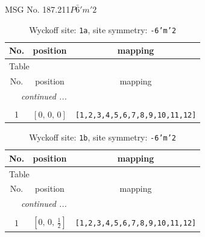 \documentclass[fleqn,8pt]{jsarticle}
\begin{document}
\setcounter{MaxMatrixCols}{32}

\renewcommand{\tablename}{Table~}
\renewcommand{\figurename}{Figure~}
\begin{center}
\LARGE
MSG No. 187.211\quad$P\bar{6}'m'2$
\end{center}
\renewcommand{\arraystretch}{1.2}
\begin{longtable}{ccc}
\caption{Wyckoff site: {\tt 1a}, site symmetry: {\tt -6'm'2}}
 \\
 \hline \hline
No. & position & mapping \\ \hline \endfirsthead

\multicolumn{2}{l}{\tablename\ \thetable{}} \\
 \hline \hline
No. & position & mapping \\ \hline \endhead

 \hline \hline
\multicolumn{2}{r}{\footnotesize\it continued ...} \\ \endfoot

 \hline \hline
\multicolumn{2}{r}{} \\ \endlastfoot

1 & $\left[ 0,\, 0,\, 0 \right]$ & {\tt [1,2,3,4,5,6,7,8,9,10,11,12]} \\
\end{longtable}
\renewcommand{\arraystretch}{1.2}
\begin{longtable}{ccc}
\caption{Wyckoff site: {\tt 1b}, site symmetry: {\tt -6'm'2}}
 \\
 \hline \hline
No. & position & mapping \\ \hline \endfirsthead

\multicolumn{2}{l}{\tablename\ \thetable{}} \\
 \hline \hline
No. & position & mapping \\ \hline \endhead

 \hline \hline
\multicolumn{2}{r}{\footnotesize\it continued ...} \\ \endfoot

 \hline \hline
\multicolumn{2}{r}{} \\ \endlastfoot

1 & $\left[ 0,\, 0,\, \frac{1}{2} \right]$ & {\tt [1,2,3,4,5,6,7,8,9,10,11,12]} \\
\end{longtable}
\renewcommand{\arraystretch}{1.2}
\end{document}
